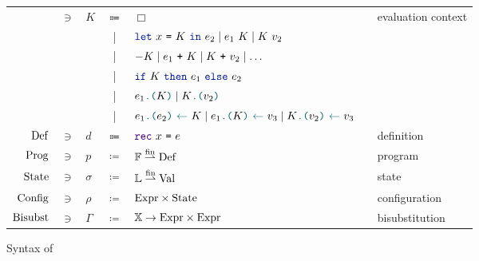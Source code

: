 \begin{figure}[tp]
\begin{tabular}{rclclcl}
            & $\ni$ &
            $K$
            & $\Coloneqq$ &
            $\Box$
            &&
            evaluation context
        \\
            &&
            & | &
            $\lambdLet{x}{K}{e_2} \mid \lambdCall{e_1}{K} \mid \lambdCall{K}{v_2}$
        \\
            &&
            & | &
            $- K \mid e_1\ \texttt{+}\ K \mid K\ \texttt{+}\ v_2 \mid \dots$
        \\
            &&
            & | &
            $\lambdIf{K}{e_1}{e_2}$
        \\
            &&
            & | &
            $\lambdLoad{e_1}{K} \mid \lambdLoad{K}{v_2}$
        \\
            &&
            & | &
            $\lambdStore{e_1}{e_2}{K} \mid \lambdStore{e_1}{K}{v_3} \mid \lambdStore{K}{v_2}{v_3}$
        \\
            $\mathrm{Def}$
            & $\ni$ &
            $d$
            & $\Coloneqq$ &
            $\lambdDef{x}{e}$
            &&
            definition
        \\
            $\mathrm{Prog}$
            & $\ni$ &
            $p$
            & $\coloneqq$ &
            $\mathbb{F} \stackrel{\mathrm{fin}}{\rightharpoonup} \mathrm{Def}$
            &&
            program
        \\
            $\mathrm{State}$
            & $\ni$ &
            $\sigma$    
            & $\coloneqq$ &
            $\mathbb{L} \stackrel{\mathrm{fin}}{\rightharpoonup} \mathrm{Val}$
            &&
            state
        \\
            $\mathrm{Config}$
            & $\ni$ &
            $\rho$
            & $\coloneqq$ &
            $\mathrm{Expr} \times \mathrm{State}$
            &&
            configuration
        \\
            $\mathrm{Bisubst}$
            & $\ni$ &
            $\Gamma$
            & $\coloneqq$ &
            $\mathbb{X} \rightarrow \mathrm{Expr} \times \mathrm{Expr}$
            &&
            bisubstitution
    \end{tabular}
    \caption{Syntax of \LambdaLang}
    \label{fig:syntax}
\end{figure}